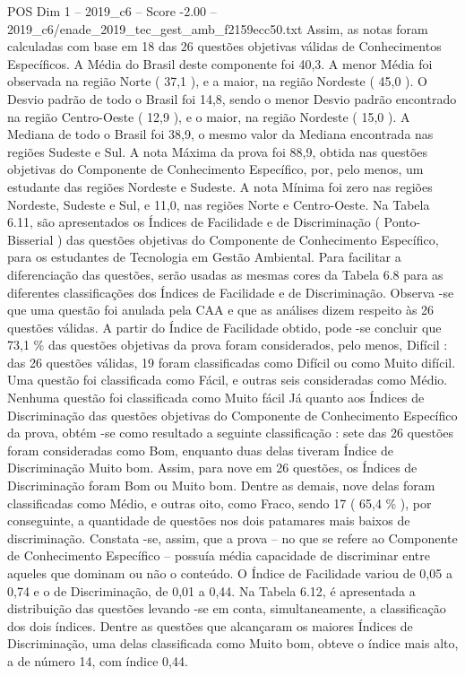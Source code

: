 \begin{textsample}{POS Dim 1 – 2019\_c6 – Score -2.00 – 2019\_c6/enade\_2019\_tec\_gest\_amb\_f2159ecc50.txt}
Assim, as notas foram calculadas com base em 18 das 26 questões objetivas válidas de Conhecimentos Específicos.
A Média do Brasil deste componente foi 40,3.
A menor Média foi observada na região Norte ( 37,1 ), e a maior, na região Nordeste ( 45,0 ).
O Desvio padrão de todo o Brasil foi 14,8, sendo o menor Desvio padrão encontrado na região Centro-Oeste ( 12,9 ), e o maior, na região Nordeste ( 15,0 ).
A Mediana de todo o Brasil foi 38,9, o mesmo valor da Mediana encontrada nas regiões Sudeste e Sul.
A nota Máxima da prova foi 88,9, obtida nas questões objetivas do Componente de Conhecimento Específico, por, pelo menos, um estudante das regiões Nordeste e Sudeste.
A nota Mínima foi zero nas regiões Nordeste, Sudeste e Sul, e 11,0, nas regiões Norte e Centro-Oeste.
Na Tabela 6.11, são apresentados os Índices de Facilidade e de Discriminação ( Ponto-Bisserial ) das questões objetivas do Componente de Conhecimento Específico, para os estudantes de Tecnologia em Gestão Ambiental.
Para facilitar a diferenciação das questões, serão usadas as mesmas cores da Tabela 6.8 para as diferentes classificações dos Índices de Facilidade e de Discriminação.
Observa -se que uma questão foi anulada pela CAA e que as análises dizem respeito às 26 questões válidas.
A partir do Índice de Facilidade obtido, pode -se concluir que 73,1 \% das questões objetivas da prova foram considerados, pelo menos, Difícil : das 26 questões válidas, 19 foram classificadas como Difícil ou como Muito difícil.
Uma questão foi classificada como Fácil, e outras seis consideradas como Médio.
Nenhuma questão foi classificada como Muito fácil Já quanto aos Índices de Discriminação das questões objetivas do Componente de Conhecimento Específico da prova, obtém -se como resultado a seguinte classificação : sete das 26 questões foram consideradas como Bom, enquanto duas delas tiveram Índice de Discriminação Muito bom.
Assim, para nove em 26 questões, os Índices de Discriminação foram Bom ou Muito bom.
Dentre as demais, nove delas foram classificadas como Médio, e outras oito, como Fraco, sendo 17 ( 65,4 \% ), por conseguinte, a quantidade de questões nos dois patamares mais baixos de discriminação.
Constata -se, assim, que a prova – no que se refere ao Componente de Conhecimento Específico – possuía média capacidade de discriminar entre aqueles que dominam ou não o conteúdo.
O Índice de Facilidade variou de 0,05 a 0,74 e o de Discriminação, de 0,01 a 0,44.
Na Tabela 6.12, é apresentada a distribuição das questões levando -se em conta, simultaneamente, a classificação dos dois índices.
Dentre as questões que alcançaram os maiores Índices de Discriminação, uma delas classificada como Muito bom, obteve o índice mais alto, a de número 14, com índice 0,44.

\end{textsample}
